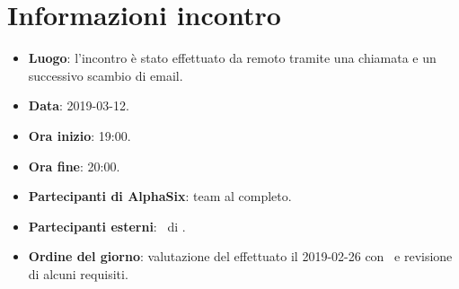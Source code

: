 \newcommand{\documento}{\VE}
\newcommand{\nomedocumentofisico}{VE\_2019-03-12.pdf}
\newcommand{\redazione}{\TG}
\newcommand{\verifica}{\CV}
\newcommand{\approvazione}{\NC}
\newcommand{\versione}{1.0.0}
\newcommand{\uso}{Esterno}
\newcommand{\destinateTo}{\TV, \\ & \RC, \\ & \II}
\newcommand{\datacreazione}{13 marzo 2019}
\newcommand{\datamodifica}{15 marzo 2019}
\newcommand{\stato}{Approvato}

\def\TABELLE{false}	%
\def\FIGURE{false} 	%






    

    
    
    \section{Informazioni incontro}
    	\begin{itemize}
    		\item \textbf{Luogo}: l'incontro è stato effettuato da remoto tramite una chiamata  e un successivo scambio di email.
    		\item \textbf{Data}: 2019-03-12.
    		\item \textbf{Ora inizio}: 19:00.
    		\item \textbf{Ora fine}: 20:00.
    		\item \textbf{Partecipanti di AlphaSix}: team al completo.
    		\item \textbf{Partecipanti esterni}: \DZ~di \II.
    		\item \textbf{Ordine del giorno}: valutazione del  effettuato il 2019-02-26 con \RC\ e revisione di alcuni requisiti.
    		
    	\end{itemize}
    
